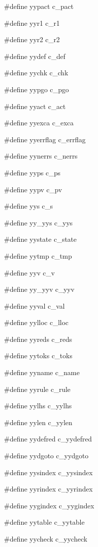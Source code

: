 \medskip
{\stt \#define yypact c\_pact}

\medskip
{\stt \#define yyr1 c\_r1}

\medskip
{\stt \#define yyr2 c\_r2}

\medskip
{\stt \#define yydef c\_def}

\medskip
{\stt \#define yychk c\_chk}

\medskip
{\stt \#define yypgo c\_pgo}

\medskip
{\stt \#define yyact c\_act}

\medskip
{\stt \#define yyexca c\_exca}

\medskip
{\stt \#define yyerrflag c\_errflag}

\medskip
{\stt \#define yynerrs c\_nerrs}

\medskip
{\stt \#define yyps c\_ps}

\medskip
{\stt \#define yypv c\_pv}

\medskip
{\stt \#define yys c\_s}

\medskip
{\stt \#define yy\_yys c\_yys}

\medskip
{\stt \#define yystate c\_state}

\medskip
{\stt \#define yytmp c\_tmp}

\medskip
{\stt \#define yyv c\_v}

\medskip
{\stt \#define yy\_yyv c\_yyv}

\medskip
{\stt \#define yyval c\_val}

\medskip
{\stt \#define yylloc c\_lloc}

\medskip
{\stt \#define yyreds c\_reds}

\medskip
{\stt \#define yytoks c\_toks}

\medskip
{\stt \#define yyname c\_name}

\medskip
{\stt \#define yyrule c\_rule}

\medskip
{\stt \#define yylhs c\_yylhs}

\medskip
{\stt \#define yylen c\_yylen}

\medskip
{\stt \#define yydefred c\_yydefred}

\medskip
{\stt \#define yydgoto c\_yydgoto}

\medskip
{\stt \#define yysindex c\_yysindex}

\medskip
{\stt \#define yyrindex c\_yyrindex}

\medskip
{\stt \#define yygindex c\_yygindex}

\medskip
{\stt \#define yytable c\_yytable}

\medskip
{\stt \#define yycheck c\_yycheck}


